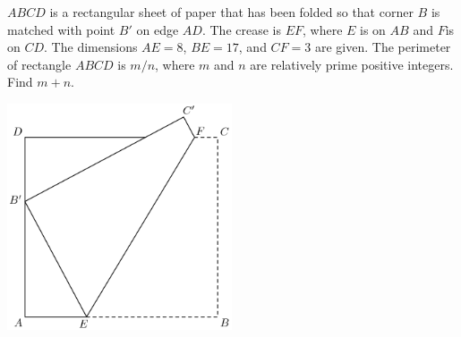 $ABCD$ is a rectangular sheet of paper that has been folded so that corner $B$ is matched with point $B'$ on edge $AD$. The crease is $EF$, where $E$ is on $AB$ and $F$is on $CD$. The dimensions $AE=8$, $BE=17$, and $CF=3$ are given. The perimeter of rectangle $ABCD$ is $m/n$, where $m$ and $n$ are relatively prime positive integers. Find $m+n$.
\begin{center}
\includegraphics[width = 66.4mm]{img/fig0.png}
\end{center}